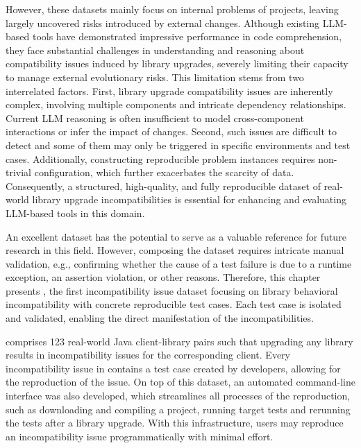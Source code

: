 However, these datasets mainly focus on internal problems of projects, leaving largely uncovered risks introduced by external changes. Although existing LLM-based tools have demonstrated impressive performance in code comprehension, they face substantial challenges in understanding and reasoning about compatibility issues induced by library upgrades, severely limiting their capacity to manage external evolutionary risks. This limitation stems from two interrelated factors. First, library upgrade compatibility issues are inherently complex, involving multiple components and intricate dependency relationships. Current LLM reasoning is often insufficient to model cross-component interactions or infer the impact of changes. Second, such issues are difficult to detect and some of them may only be triggered in specific environments and test cases. Additionally, constructing reproducible problem instances requires non-trivial configuration, which further exacerbates the scarcity of data. Consequently, a structured, high-quality, and fully reproducible dataset of real-world library upgrade incompatibilities is essential for enhancing and evaluating LLM-based tools in this domain.


An excellent dataset has the potential to serve as a valuable reference for future research in
this field. However, composing the dataset requires intricate
manual validation, e.g., confirming whether the cause of a test
failure is due to a runtime exception, an assertion violation, or other reasons.
Therefore, this chapter presents \toolcompsuite, the first incompatibility issue dataset focusing on
library behavioral incompatibility with concrete reproducible test cases.
Each test case is isolated and validated, enabling the direct manifestation of the
incompatibilities.


\toolcompsuite comprises 123 real-world Java client-library pairs such that upgrading any library results in
incompatibility issues for the corresponding client.
Every incompatibility issue in \toolcompsuite contains a test case created by developers, allowing for the
reproduction of the issue.
On top of this dataset, an automated command-line interface was also developed, which streamlines
all processes of the reproduction, such as downloading and compiling a project, running target
tests and rerunning the tests after a library upgrade.
With this infrastructure, users may reproduce an incompatibility issue programmatically with
minimal effort.






